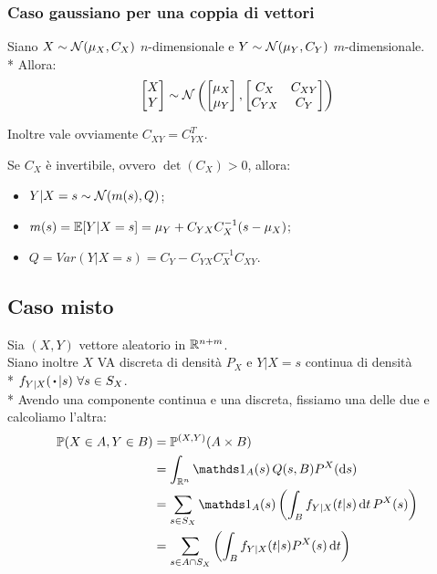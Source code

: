 \subsubsection{Caso gaussiano per una coppia di vettori}

\begin{prop}
  Siano $X \sim \mathcal N(\mu_X, C_X)$ $n$-dimensionale e $Y \sim \mathcal N(\mu_Y, C_Y)$ $m$-dimensionale. \\*
  Allora:
  $$\begin{bmatrix}X \\ Y \end{bmatrix} \sim \mathcal N \left(\begin{bmatrix}\mu_X \\ \mu_Y \end{bmatrix}, \begin{bmatrix}C_X & C_{XY} \\ C_{YX} & C_Y \end{bmatrix}\right)$$

  Inoltre vale ovviamente $C_{XY} = C_{YX}^T$.
\end{prop}

\medskip
\begin{prop}
  Se $C_X$ è invertibile, ovvero $\det(C_X) > 0$, allora:
  \begin{itemize}
    \item $Y|X=s \sim \mathcal N(m(s), Q)$;
    \item $m(s) = \mathbb E[Y|X=s] = \mu_Y + C_{YX} C_X^{-1} (s-\mu_X)$;
    \item $Q = Var(Y|X=s) = C_Y - C_{YX}C_X^{-1}C_{XY}$.
  \end{itemize}
\end{prop}

\subsection{Caso misto}
Sia $(X,Y)$ vettore aleatorio in $\mathbb R^{n+m}$. \\
Siano inoltre $X$ VA discreta di densità $P_X$ e $Y|X = s$ continua di densità \\* $f_{Y|X} (\, \bigcdot \,| s) \ \forall s \in S_X$.\\*
Avendo una componente continua e una discreta, fissiamo una delle due e calcoliamo l'altra:
\begin{align*}
	\PP(X \in A, Y \in B) &= \PP^{(X,Y)} (A \times B) \\
	&= \int_{\RR^n} \Ind_A (s) \, Q(s,B) P^X (\de s) \\
	&=\sum\limits_{s \in S_X} \Ind_A (s) \left( \int_{B}  f_{Y|X} (t|s) \, \de t \, P^X(s) \right) \\
	&= \sum\limits_{s \in A \cap S_X} \left(\int_{B} f_{Y|X} (t|s) P^X(s) \, \de t \right)
\end{align*}


